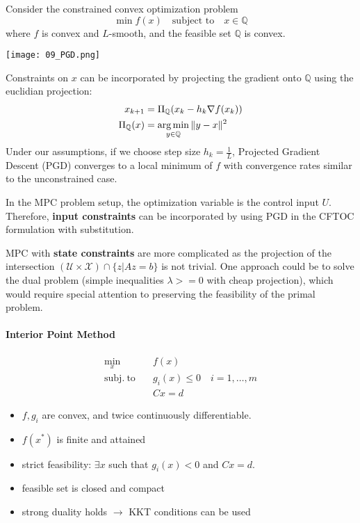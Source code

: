 Consider the constrained convex optimization problem
\begin{equation*}
    \min f(x) \quad \text{subject to} \quad x \in \mathbb{Q}
\end{equation*}
where $f$ is convex and $L$-smooth, and the feasible set $\mathbb{Q}$ is convex.
\newpar{}
\begin{center}
    \texttt{[image: 09\_PGD.png]}
\end{center}
Constraints on $x$ can be incorporated by projecting the gradient onto $\mathbb{Q}$ using the euclidian projection:
\begin{align*}
    x_{k+1}             & = \Pi_{\mathbb{Q}}(x_k - h_k \nabla f(x_k)) \\
    \Pi_{\mathbb{Q}}(x) & = \operatorname*{arg\,min}_{y\in\mathbb{Q}} \|y-x\|^2
\end{align*}
Under our assumptions, if we choose step size $h_k = \frac{1}{L}$, Projected Gradient Descent (PGD) converges to a local minimum of $f$ with convergence rates similar to the unconstrained case.

\newpar{}

In the MPC problem setup, the optimization variable is the control input $U$. Therefore, \textbf{input constraints} can be incorporated by using PGD in the CFTOC formulation with substitution.

\newpar{}
MPC with \textbf{state constraints} are more complicated as the projection of the intersection $(\mathcal{U}\times \mathcal{X}) \cap \{ z|Az=b\}$ is not trivial. One approach could be to solve the dual problem (simple inequalities $\lambda>=0$ with cheap projection), which would require special attention to preserving the feasibility of the primal problem.

\paragraph{Interior Point Method}
\begin{align*}
    \min_x \quad            & f(x)                             \\
    \mathrm{subj.\ to}\quad & g_i(x)\leq 0 \quad i=1,\ldots, m \\
                            & Cx = d
\end{align*}
\begin{itemize}
    \item $f, g_i$ are convex, and twice continuously differentiable.
    \item $f(x^*)$ is finite and attained
    \item strict feasibility: $\exists x$ such that $g_i(x) < 0$ and $Cx = d$.
    \item feasible set is closed and compact
    \item strong duality holds $\to$ KKT conditions can be used
\end{itemize}

